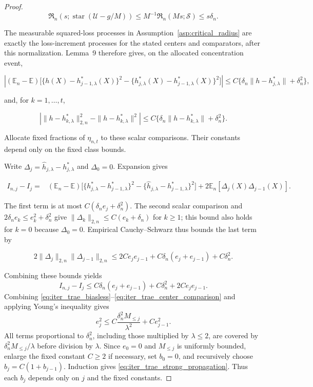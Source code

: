 \begin{proof}
\[
\mathfrak R_n(s;\operatorname{star}(\mathcal U-g/M))
\leqslant M^{-1}\mathfrak R_n(Ms;\mathcal S)
\leqslant s\delta_n.
\]

The measurable squared-loss processes in Assumption~\ref{asp:critical_radius} are exactly the loss-increment processes for the stated centers and comparators, after this normalization. Lemma~9 therefore gives, on the allocated concentration event,

\[
\left|(\mathbb E_n-\mathbb E)
\bigl[\{h(X)-h_{j-1,\lambda}^*(X)\}^2
-\{h_{j,\lambda}^*(X)-h_{j-1,\lambda}^*(X)\}^2\bigr]\right|
\leqslant C\{\delta_n\|h-h_{j,\lambda}^*\|+\delta_n^2\},
\]

and, for $k=1,\ldots,t$,

\[
\left|\|h-h_{k,\lambda}^*\|_{2,n}^2-\|h-h_{k,\lambda}^*\|^2\right|
\leqslant C\{\delta_n\|h-h_{k,\lambda}^*\|+\delta_n^2\}.
\]

Allocate fixed fractions of $\eta_{n,t}$ to these scalar comparisons. Their constants depend only on the fixed class bounds. 

Write $\Delta_j=\hat h_{j,\lambda}-h_{j,\lambda}^*$ and $\Delta_0=0$. Expansion gives

\[
\begin{split}
I_{n,j}-I_j
={}&(\mathbb E_n-\mathbb E)
\bigl[\{h_{j,\lambda}^*-h_{j-1,\lambda}^*\}^2
-\{\hat h_{j,\lambda}-h_{j-1,\lambda}^*\}^2\bigr]
+2\mathbb E_n[\Delta_j(X)\Delta_{j-1}(X)].
\end{split}
\]

The first term is at most $C(\delta_ne_j+\delta_n^2)$. The second scalar comparison and $2\delta_ne_k\leqslant e_k^2+\delta_n^2$ give
$\|\Delta_k\|_{2,n}\leqslant C(e_k+\delta_n)$ for $k\geqslant1$; this bound also holds for $k=0$ because $\Delta_0=0$. Empirical Cauchy--Schwarz thus bounds the last term by

\[
2\|\Delta_j\|_{2,n}\|\Delta_{j-1}\|_{2,n}
\leqslant 2Ce_je_{j-1}+C\delta_n(e_j+e_{j-1})+C\delta_n^2.
\]

Combining these bounds yields
\begin{equation}\label{eq:iter_trae_center_comparison}
I_{n,j}-I_j \leqslant C\delta_n(e_j+e_{j-1})+C\delta_n^2+2Ce_je_{j-1}.
\end{equation}
Combining \eqref{eq:iter_trae_biasless}--\eqref{eq:iter_trae_center_comparison}
and applying Young's inequality gives
\[
e_j^2\leqslant C\frac{\delta_n^2M_{\leqslant j}}{\lambda^2}+Ce_{j-1}^2.
\]
All terms proportional to $\delta_n^2$, including those multiplied by $\lambda\leqslant2$, are covered by
$\delta_n^2M_{\leqslant j}/\lambda$ before division by $\lambda$.
Since $e_0=0$ and $M_{\leqslant j}$ is uniformly bounded, enlarge the fixed
constant $C\geqslant2$ if necessary, set $b_0=0$, and recursively choose
$b_j=C(1+b_{j-1})$. Induction gives
\eqref{eq:iter_trae_strong_propagation}. Thus each $b_j$ depends only on $j$
and the fixed constants.


\end{proof}
